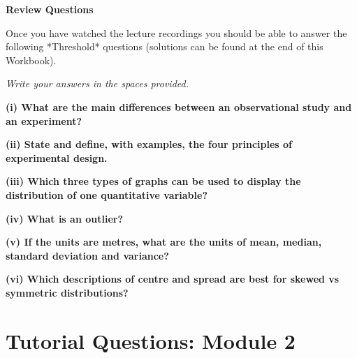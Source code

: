 \documentclass[
  11pt,
  oneside]{scrbook}
\begin{document}
\begin{bannerbox}
\textbf{Review Questions}

Once you have watched the lecture recordings you should be able to answer the following *Threshold* questions (solutions can be found at the end of this Workbook).
\end{bannerbox}

\textit{Write your answers in the spaces provided.}

\medskip

\textbf{(i) What are the main differences between an observational study and an experiment?}

\begin{answerbox}\vspace{3cm}\end{answerbox}

\textbf{(ii) State and define, with examples, the four principles of experimental design.}

\begin{answerbox}\vspace{3cm}\end{answerbox}

\textbf{(iii) Which three types of graphs can be used to display the distribution of one quantitative variable?}

\begin{answerbox}\vspace{3cm}\end{answerbox}

\textbf{(iv) What is an outlier?}

\begin{answerbox}\vspace{3cm}\end{answerbox}

\textbf{(v) If the units are metres, what are the units of mean, median, standard deviation and variance?}

\begin{answerbox}\vspace{3cm}\end{answerbox}

\textbf{(vi) Which descriptions of centre and spread are best for skewed vs symmetric distributions?}

\begin{answerbox}\vspace{3cm}\end{answerbox}

\chapter*{Tutorial Questions: Module 2}\label{tutorial-questions-module-2}
\end{document}
